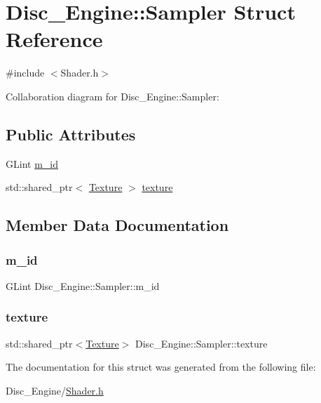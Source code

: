\hypertarget{struct_disc___engine_1_1_sampler}{}\section{Disc\+\_\+\+Engine\+:\+:Sampler Struct Reference}
\label{struct_disc___engine_1_1_sampler}


{\ttfamily \#include $<$Shader.\+h$>$}



Collaboration diagram for Disc\+\_\+\+Engine\+:\+:Sampler\+:
\subsection*{Public Attributes}
\begin{DoxyCompactItemize}
\item 
G\+Lint \mbox{\hyperlink{struct_disc___engine_1_1_sampler_a236fb41600da1cd9ffbf092501b77d18}{m\+\_\+id}}
\item 
std\+::shared\+\_\+ptr$<$ \mbox{\hyperlink{class_disc___engine_1_1_texture}{Texture}} $>$ \mbox{\hyperlink{struct_disc___engine_1_1_sampler_a53a789d77a3546bf01a9dfb0a59b5afe}{texture}}
\end{DoxyCompactItemize}


\subsection{Member Data Documentation}
\mbox{\label{struct_disc___engine_1_1_sampler_a236fb41600da1cd9ffbf092501b77d18}} 
\subsubsection{\texorpdfstring{m\+\_\+id}{m\_id}}
{\footnotesize\ttfamily G\+Lint Disc\+\_\+\+Engine\+::\+Sampler\+::m\+\_\+id}

\mbox{\label{struct_disc___engine_1_1_sampler_a53a789d77a3546bf01a9dfb0a59b5afe}} 
\subsubsection{\texorpdfstring{texture}{texture}}
{\footnotesize\ttfamily std\+::shared\+\_\+ptr$<$\mbox{\hyperlink{class_disc___engine_1_1_texture}{Texture}}$>$ Disc\+\_\+\+Engine\+::\+Sampler\+::texture}



The documentation for this struct was generated from the following file\+:\begin{DoxyCompactItemize}
\item 
Disc\+\_\+\+Engine/\mbox{\hyperlink{_shader_8h}{Shader.\+h}}\end{DoxyCompactItemize}
